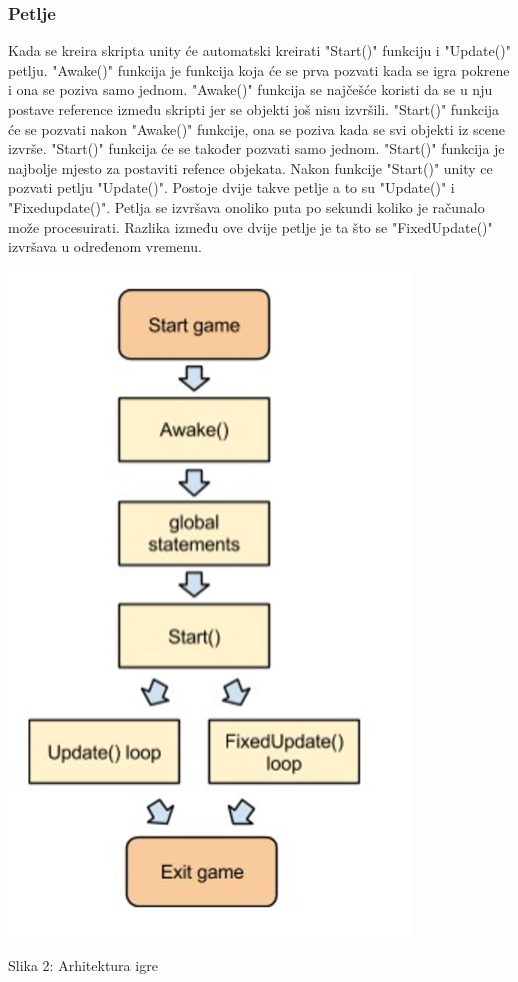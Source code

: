\subsubsection{Petlje}
Kada se kreira skripta unity će automatski kreirati "Start()" funkciju i "Update()" petlju. "Awake()" funkcija je funkcija koja će se prva pozvati kada se igra pokrene i ona se poziva samo jednom. "Awake()" funkcija se najčešće koristi da se u nju postave reference između skripti jer se objekti još nisu izvršili. "Start()" funkcija će se pozvati nakon "Awake()" funkcije, ona se poziva kada se svi objekti iz scene izvrše. "Start()" funkcija će se također pozvati samo jednom. "Start()" funkcija je najbolje mjesto za postaviti refence objekata. Nakon funkcije "Start()" unity ce pozvati petlju "Update()". Postoje dvije takve petlje a to su "Update()" i "Fixedupdate()". Petlja se izvršava onoliko puta po sekundi koliko je računalo može procesuirati. Razlika između ove dvije petlje je ta što se "FixedUpdate()" izvršava u određenom vremenu.
\begin{center}
\includegraphics[scale=0.65]{loop.png}


Slika 2: Arhitektura igre
\end{center}

